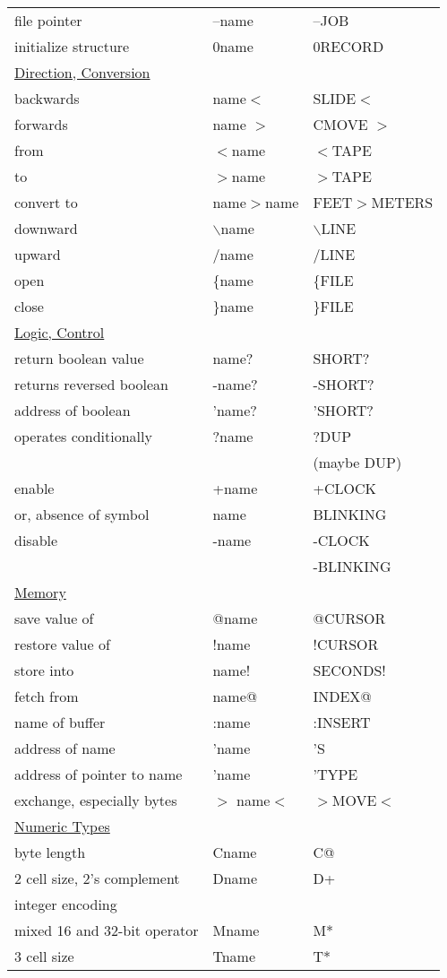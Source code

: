 \begin{longtable}{lll}
file pointer&--name&--JOB\\
initialize structure&0name&0RECORD\\[1ex]
\underline{Direction, Conversion}\\
backwards&name\(<\)&SLIDE\(<\)\\
forwards&name \(>\)&CMOVE \(>\)\\
from&\(<\)name&\(<\)TAPE\\
to&\(>\)name&\(>\)TAPE\\
convert to&name\(>\)name&FEET\(>\)METERS\\
downward&$\backslash$name&$\backslash$LINE\\
upward&/name&/LINE\\
open&\{name&\{FILE\\
close&\}name&\}FILE\\[1ex]
\underline{Logic, Control}\\
return boolean value&name?&SHORT?\\
returns reversed boolean&-name?&-SHORT?\\
address of boolean&'name?&'SHORT?\\
operates conditionally&?name&?DUP\\
&&(maybe DUP)\\
enable&+name&+CLOCK\\
or, absence of symbol&name&BLINKING\\
disable&-name&-CLOCK\\
&&-BLINKING\\[1ex]
\underline{Memory}\\
save value of&@name&@CURSOR\\
restore value of&!name&!CURSOR\\
store into&name!&SECONDS!\\
fetch from&name@&INDEX@\\
name of buffer&:name&:INSERT\\
address of name&'name&'S\\
address of pointer to name&'name&'TYPE\\
exchange, especially bytes&\(>\) name\(<\)&\(>\)MOVE\(<\)\\[1ex]
\underline{Numeric Types}\\
byte length&Cname&C@\\
2 cell size, 2's complement&Dname&D+\\
integer encoding\\
mixed 16 and 32-bit operator&Mname&M*\\
3 cell size&Tname&T*\\

\end{longtable}
